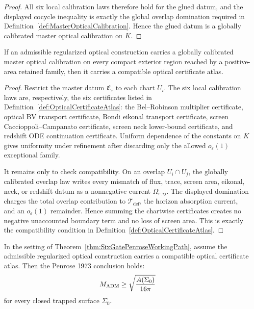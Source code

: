 \begin{proof}
All six local calibration laws therefore hold for the glued datum, and the displayed cocycle inequality is exactly the global overlap domination required in Definition~\ref{def:MasterOpticalCalibration}. Hence the glued datum is a globally calibrated master optical calibration on $K$.
\end{proof}

\begin{theorem}\label{thm:MasterCalibrationCertificateAtlas}
If an admissible regularized optical construction carries a globally calibrated master optical calibration on every compact exterior region reached by a positive-area retained family, then it carries a compatible optical certificate atlas.
\end{theorem}

\begin{proof}
Restrict the master datum $\mathfrak C_\varepsilon$ to each chart $U_i$. The six local calibration laws are, respectively, the six certificates listed in Definition~\ref{def:OpticalCertificateAtlas}: the Bel--Robinson multiplier certificate, optical BV transport certificate, Bondi eikonal transport certificate, screen Caccioppoli--Campanato certificate, screen neck lower-bound certificate, and redshift ODE continuation certificate. Uniform dependence of the constants on $K$ gives uniformity under refinement after discarding only the allowed $o_\varepsilon(1)$ exceptional family.

It remains only to check compatibility. On an overlap $U_i\cap U_j$, the globally calibrated overlap law writes every mismatch of flux, trace, screen area, eikonal, neck, or redshift datum as a nonnegative current $\Omega_{\varepsilon,ij}$. The displayed domination charges the total overlap contribution to $\mathcal T_{\mathrm{def}}$, the horizon absorption current, and an $o_\varepsilon(1)$ remainder. Hence summing the chartwise certificates creates no negative unaccounted boundary term and no loss of screen area. This is exactly the compatibility condition in Definition~\ref{def:OpticalCertificateAtlas}.
\end{proof}

\begin{theorem}\label{thm:CertificateAtlasCompletion}
In the setting of Theorem~\ref{thm:SixGatePenroseWorkingPath}, assume the admissible regularized optical construction carries a compatible optical certificate atlas. Then the Penrose 1973 conclusion holds:
\[
    M_{\mathrm{ADM}}\ge \sqrt{\frac{A(\Sigma_0)}{16\pi}}
\]
for every closed trapped surface $\Sigma_0$.
\end{theorem}

